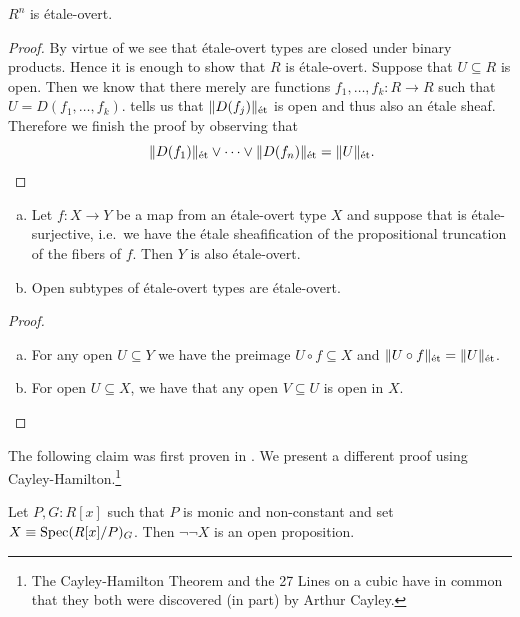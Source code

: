 \begin{corollary}
  \(R^n\) is étale-overt.
\end{corollary}

\begin{proof}
  By virtue of  we see that étale-overt types are closed under binary products.
  Hence it is enough to show that $R$ is étale-overt.
  Suppose that $U \subseteq R$ is open.
  Then we know that there merely are functions $f_1,\dots,f_k : R \to R$ such that \(U=D(f_1,\dots,f_k)\).
   tells us that \(\|D(f_j)\|_\et\) is open and thus also an étale sheaf.
  Therefore we finish the proof by observing that
  \[
    \|D(f_1)\|_\et\vee\dots\vee\|D(f_n)\|_\et=\|U\|_\et\rlap{.}
  \]
\end{proof}

\begin{lemma}\label{image-and-subtypes-of-étale-overt-types}
  \begin{enumerate}[(a)]
    \item
      Let $f : X \to Y$ be a map from an étale-overt type $X$ and suppose that is étale-surjective, i.e.\ we have the étale sheafification of the propositional truncation of the fibers of $f$.
    Then $Y$ is also étale-overt.
  \item Open subtypes of étale-overt types are étale-overt.
  \end{enumerate}
\end{lemma}

\begin{proof}
  \begin{enumerate}[(a)]
  \item For any open \(U\subseteq Y\) we have the preimage \(U\circ f\subseteq X\) and
    \(\|U\circ f\|_\et=\|U\|_\et\).
  \item For open \(U\subseteq X\), we have that any open \(V\subseteq U\) is open in \(X\).
  \end{enumerate}
\end{proof}

The following claim was first proven in \cite[Lemma 1.1.7]{étale-sheaves-compendium}.
We present a different proof using Cayley-Hamilton.\footnote{The Cayley-Hamilton Theorem and the 27 Lines on a cubic have in common that they both were discovered (in part) by Arthur Cayley.}

\begin{lemma}
  \label{notnot-Spec(R[X]/P)_G-is-open}
  Let $P,G : R[x]$ such that $P$ is monic and non-constant and set $X \equiv \Spec (R[x]/P)_G$.
  Then $\neg\neg X$ is an open proposition.
\end{lemma}

